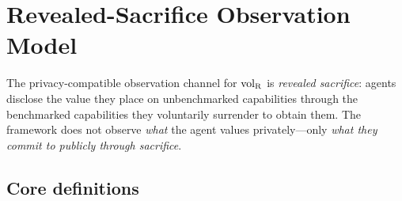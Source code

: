 \section{Revealed-Sacrifice Observation Model}
\label{sec:sacrifice_model}

The privacy-compatible observation channel for ${\operatorname{vol}_{\mathrm{R}}}$ is
\emph{revealed sacrifice}: agents disclose the value they place on
unbenchmarked capabilities through the benchmarked capabilities
they voluntarily surrender to obtain them.  The framework does not
observe \emph{what} the agent values privately---only \emph{what
they commit to publicly through sacrifice}.

\subsection{Core definitions}


